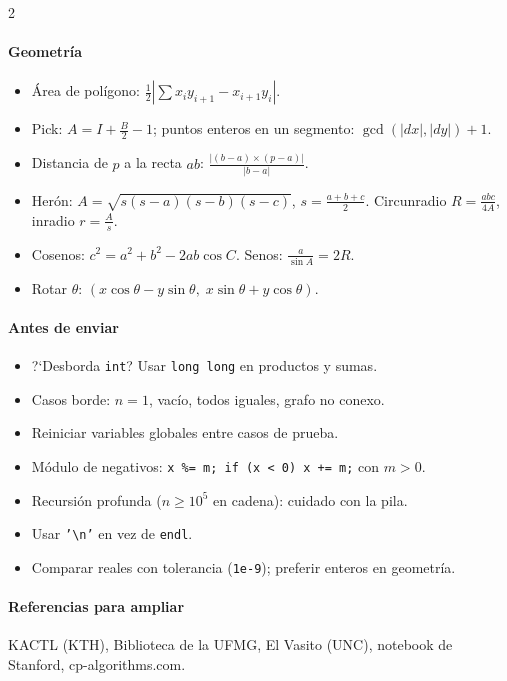 \documentclass[8pt,a4paper,landscape]{extarticle}
\begin{document}
\begin{multicols*}{2}
\paragraph{Geometr\'ia}
\begin{itemize}
\item \'Area de pol\'igono: $\frac12\left|\sum x_i y_{i+1} -
  x_{i+1} y_i\right|$.
\item Pick: $A = I + \frac{B}{2} - 1$; puntos enteros en un segmento:
  $\gcd(|dx|,|dy|) + 1$.
\item Distancia de $p$ a la recta $ab$:
  $\frac{|(b-a)\times(p-a)|}{|b-a|}$.
\item Her\'on: $A = \sqrt{s(s-a)(s-b)(s-c)}$, $s = \frac{a+b+c}{2}$.
  Circunradio $R = \frac{abc}{4A}$, inradio $r = \frac{A}{s}$.
\item Cosenos: $c^2 = a^2+b^2-2ab\cos C$. Senos:
  $\frac{a}{\sin A} = 2R$.
\item Rotar $\theta$: $(x\cos\theta - y\sin\theta,\;
  x\sin\theta + y\cos\theta)$.
\end{itemize}

\paragraph{Antes de enviar}
\begin{itemize}
\item ?`Desborda \texttt{int}? Usar \texttt{long long} en productos y
  sumas.
\item Casos borde: $n = 1$, vac\'io, todos iguales, grafo no conexo.
\item Reiniciar variables globales entre casos de prueba.
\item M\'odulo de negativos: \texttt{x \%= m; if (x < 0) x += m;} con $m>0$.
\item Recursi\'on profunda ($n \ge 10^5$ en cadena): cuidado con la
  pila.
\item Usar \texttt{'\textbackslash n'} en vez de \texttt{endl}.
\item Comparar reales con tolerancia (\texttt{1e-9}); preferir
  enteros en geometr\'ia.
\end{itemize}

\paragraph{Referencias para ampliar}
KACTL (KTH), Biblioteca de la UFMG, El Vasito (UNC), notebook de
Stanford, cp-algorithms.com.

\end{multicols*}
\end{document}
